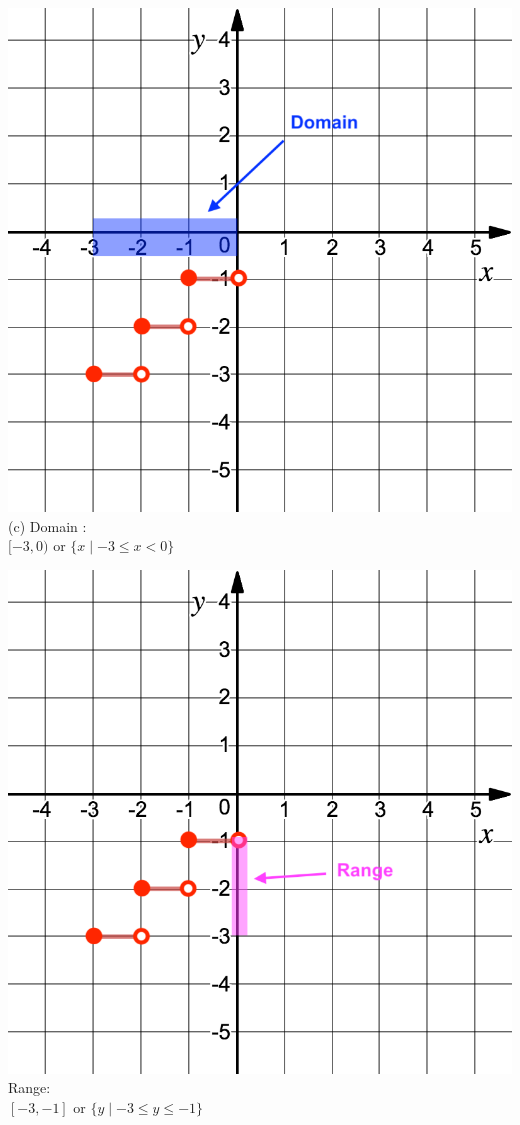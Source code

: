 \vspace{0.4cm}
\noindent\begin{minipage}{0.4\textwidth}%
\includegraphics[width=\linewidth]{Pics/ex4_c_D.png}
(c) Domain :\\ $[-3,0)$ or $\{x \mid -3 \le x < 0\}$
\end{minipage}%
\hfill%
\begin{minipage}{0.4\textwidth}
\includegraphics[width=\linewidth]{Pics/ex4_c_R.png}
Range:\\ $[-3,-1]$ or $\{y \mid -3 \le y \le -1\}$
\end{minipage}